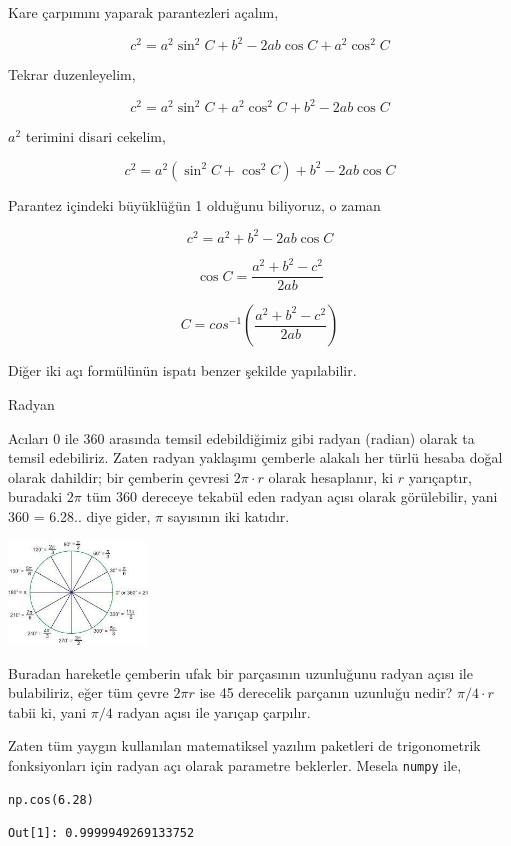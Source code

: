 \documentclass[12pt,fleqn]{article}\usepackage{../../common}
\begin{document}
Kare çarpımını yaparak parantezleri açalım,

$$
c^2 = a^2 \sin^2 C + b^2 - 2ab\cos C + a^2 \cos^2 C
$$

Tekrar duzenleyelim,

$$
c^2 = a^2 \sin^2 C + a^2 \cos^2 C + b^2 - 2ab \cos C
$$

$a^2$ terimini disari cekelim,

$$
c^2 = a^2 (\sin^2 C + \cos^2 C) + b^2 - 2ab\cos C
$$

Parantez içindeki büyüklüğün 1 olduğunu biliyoruz, o zaman

$$
c^2 = a^2 + b^2 - 2ab\cos C
$$

$$
\cos C = \frac{a^2 + b^2 - c^2}{2ab}
$$

$$
C = cos^{-1} \left( \frac{a^2 + b^2 - c^2}{2ab}  \right)
$$

Diğer iki açı formülünün ispatı benzer şekilde yapılabilir.

Radyan

Acıları 0 ile 360 arasında temsil edebildiğimiz gibi radyan (radian) olarak ta
temsil edebiliriz. Zaten radyan yaklaşımı çemberle alakalı her türlü hesaba
doğal olarak dahildir; bir çemberin çevresi $2 \pi \cdot r$ olarak hesaplanır,
ki $r$ yarıçaptır, buradaki $2 \pi$ tüm 360 dereceye tekabül eden radyan açısı
olarak görülebilir, yani 360 = 6.28.. diye gider, $\pi$ sayısının iki katıdır.

\includegraphics[width=10em]{ode_mattuck_50_trig_05.jpg}

Buradan hareketle çemberin ufak bir parçasının uzunluğunu radyan açısı ile
bulabiliriz, eğer tüm çevre $2 \pi r$ ise 45 derecelik parçanın uzunluğu
nedir? $\pi / 4 \cdot r$ tabii ki, yani $\pi / 4$ radyan açısı ile yarıçap
çarpılır.

Zaten tüm yaygın kullanılan matematiksel yazılım paketleri de trigonometrik
fonksiyonları için radyan açı olarak parametre beklerler. Mesela \verb!numpy!
ile,

\begin{verbatim}
np.cos(6.28)
\end{verbatim}

\begin{verbatim}
Out[1]: 0.9999949269133752
\end{verbatim}
\end{document}
